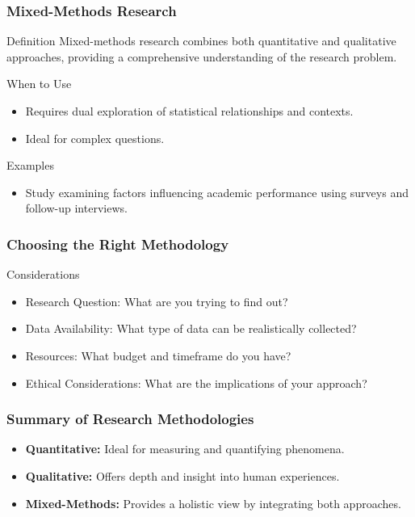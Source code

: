 \documentclass[aspectratio=169]{beamer}
\begin{document}
\begin{frame}[fragile]
    \frametitle{Mixed-Methods Research}
    \begin{block}{Definition}
        Mixed-methods research combines both quantitative and qualitative approaches, providing a comprehensive understanding of the research problem.
    \end{block}
    \begin{block}{When to Use}
        \begin{itemize}
            \item Requires dual exploration of statistical relationships and contexts.
            \item Ideal for complex questions.
        \end{itemize}
    \end{block}
    
    \begin{block}{Examples}
        \begin{itemize}
            \item Study examining factors influencing academic performance using surveys and follow-up interviews.
        \end{itemize}
    \end{block}
\end{frame}

\begin{frame}[fragile]
    \frametitle{Choosing the Right Methodology}
    \begin{block}{Considerations}
        \begin{itemize}
            \item Research Question: What are you trying to find out?
            \item Data Availability: What type of data can be realistically collected?
            \item Resources: What budget and timeframe do you have?
            \item Ethical Considerations: What are the implications of your approach?
        \end{itemize}
    \end{block}
\end{frame}

\begin{frame}[fragile]
    \frametitle{Summary of Research Methodologies}
    \begin{itemize}
        \item \textbf{Quantitative:} Ideal for measuring and quantifying phenomena.
        \item \textbf{Qualitative:} Offers depth and insight into human experiences.
        \item \textbf{Mixed-Methods:} Provides a holistic view by integrating both approaches.
    \end{itemize}
\end{frame}
\end{document}
